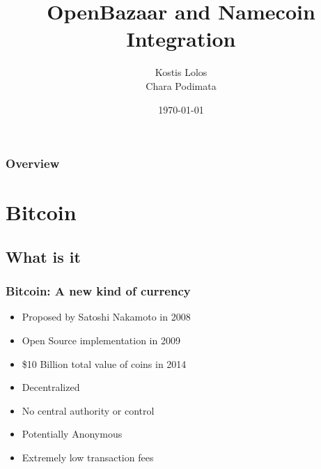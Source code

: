 \documentclass{beamer}
\title[OB+NMC - lolosk, charapod]{OpenBazaar and Namecoin Integration} %
\author{Kostis Lolos \\ Chara Podimata} %
\institute[NTUA] %
{
National Technical University of Athens \\ %
\medskip
\textit{lolos.kostis@gmail.com \\ charapod@gmail.com} %
}
\date{\today} %
\begin{document}
\begin{frame}
\titlepage %
\end{frame}

\begin{frame}
\frametitle{Overview} %
\tableofcontents %
\end{frame}


\section{Bitcoin} 
\subsection{What is it}
\begin{frame}
\frametitle{Bitcoin: A new kind of currency}
\begin{itemize}
\item Proposed by Satoshi Nakamoto in 2008
\item Open Source implementation in 2009
\item \$10 Billion total value of coins in 2014
\item Decentralized
\item No central authority or control
\item Potentially Anonymous
\item Extremely low transaction fees
\end{itemize}
\end{frame}
\end{document}

